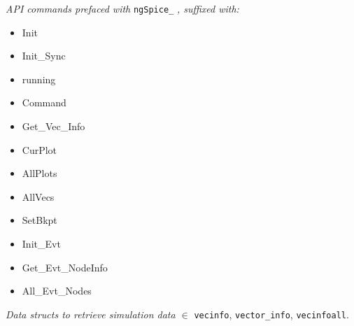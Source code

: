 \textit{API commands prefaced with } \texttt{ngSpice\_} \textit{, suffixed with:}
\begin{multicols}{2}
{\footnotesize 
\begin{itemize}[label={}]
    \item Init
    \item Init\_Sync
    \item running
    \item Command
    \item Get\_Vec\_Info
    \item CurPlot
    \item AllPlots
    \item AllVecs
    \item SetBkpt
    \item Init\_Evt
    \item Get\_Evt\_NodeInfo
    \item All\_Evt\_Nodes
\end{itemize}
}
\end{multicols}

\textit{Data structs to retrieve simulation data $\in$} \texttt{vecinfo}, \texttt{vector\_info}, \texttt{vecinfoall}. \\





